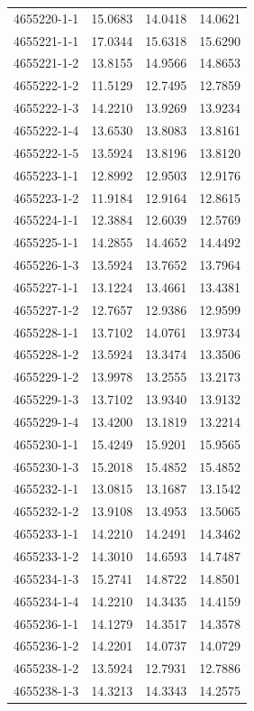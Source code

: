 \begin{longtable}{lrrr}
4655220-1-1 & 15.0683 & 14.0418 & 14.0621 \\
4655221-1-1 & 17.0344 & 15.6318 & 15.6290 \\
4655221-1-2 & 13.8155 & 14.9566 & 14.8653 \\
4655222-1-2 & 11.5129 & 12.7495 & 12.7859 \\
4655222-1-3 & 14.2210 & 13.9269 & 13.9234 \\
4655222-1-4 & 13.6530 & 13.8083 & 13.8161 \\
4655222-1-5 & 13.5924 & 13.8196 & 13.8120 \\
4655223-1-1 & 12.8992 & 12.9503 & 12.9176 \\
4655223-1-2 & 11.9184 & 12.9164 & 12.8615 \\
4655224-1-1 & 12.3884 & 12.6039 & 12.5769 \\
4655225-1-1 & 14.2855 & 14.4652 & 14.4492 \\
4655226-1-3 & 13.5924 & 13.7652 & 13.7964 \\
4655227-1-1 & 13.1224 & 13.4661 & 13.4381 \\
4655227-1-2 & 12.7657 & 12.9386 & 12.9599 \\
4655228-1-1 & 13.7102 & 14.0761 & 13.9734 \\
4655228-1-2 & 13.5924 & 13.3474 & 13.3506 \\
4655229-1-2 & 13.9978 & 13.2555 & 13.2173 \\
4655229-1-3 & 13.7102 & 13.9340 & 13.9132 \\
4655229-1-4 & 13.4200 & 13.1819 & 13.2214 \\
4655230-1-1 & 15.4249 & 15.9201 & 15.9565 \\
4655230-1-3 & 15.2018 & 15.4852 & 15.4852 \\
4655232-1-1 & 13.0815 & 13.1687 & 13.1542 \\
4655232-1-2 & 13.9108 & 13.4953 & 13.5065 \\
4655233-1-1 & 14.2210 & 14.2491 & 14.3462 \\
4655233-1-2 & 14.3010 & 14.6593 & 14.7487 \\
4655234-1-3 & 15.2741 & 14.8722 & 14.8501 \\
4655234-1-4 & 14.2210 & 14.3435 & 14.4159 \\
4655236-1-1 & 14.1279 & 14.3517 & 14.3578 \\
4655236-1-2 & 14.2201 & 14.0737 & 14.0729 \\
4655238-1-2 & 13.5924 & 12.7931 & 12.7886 \\
4655238-1-3 & 14.3213 & 14.3343 & 14.2575 \\

\end{longtable}
